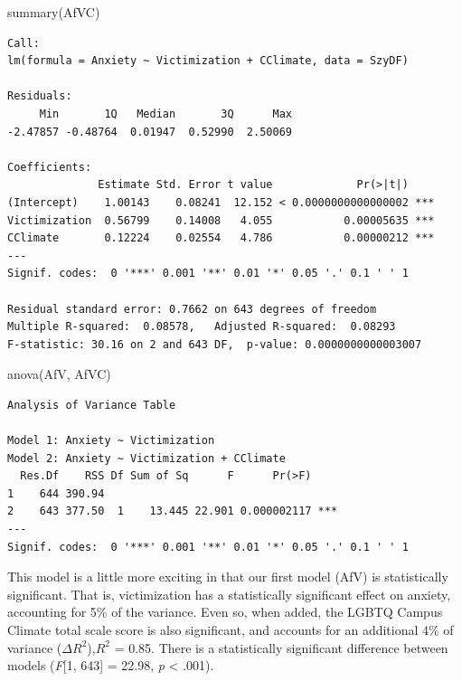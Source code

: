 \documentclass[
  english,
]{book}
\newenvironment{Shaded}{\begin{snugshade}}{\end{snugshade}}
\newcommand{\FunctionTok}[1]{\textcolor[rgb]{0.00,0.00,0.00}{#1}}
\newcommand{\NormalTok}[1]{#1}
\begin{document}
\begin{Shaded}
\begin{Highlighting}[]
\FunctionTok{summary}\NormalTok{(AfVC)}
\end{Highlighting}
\end{Shaded}

\begin{verbatim}
Call:
lm(formula = Anxiety ~ Victimization + CClimate, data = SzyDF)

Residuals:
     Min       1Q   Median       3Q      Max 
-2.47857 -0.48764  0.01947  0.52990  2.50069 

Coefficients:
              Estimate Std. Error t value             Pr(>|t|)    
(Intercept)    1.00143    0.08241  12.152 < 0.0000000000000002 ***
Victimization  0.56799    0.14008   4.055           0.00005635 ***
CClimate       0.12224    0.02554   4.786           0.00000212 ***
---
Signif. codes:  0 '***' 0.001 '**' 0.01 '*' 0.05 '.' 0.1 ' ' 1

Residual standard error: 0.7662 on 643 degrees of freedom
Multiple R-squared:  0.08578,   Adjusted R-squared:  0.08293 
F-statistic: 30.16 on 2 and 643 DF,  p-value: 0.0000000000003007
\end{verbatim}

\begin{Shaded}
\begin{Highlighting}[]
\FunctionTok{anova}\NormalTok{(AfV, AfVC)}
\end{Highlighting}
\end{Shaded}

\begin{verbatim}
Analysis of Variance Table

Model 1: Anxiety ~ Victimization
Model 2: Anxiety ~ Victimization + CClimate
  Res.Df    RSS Df Sum of Sq      F      Pr(>F)    
1    644 390.94                                    
2    643 377.50  1    13.445 22.901 0.000002117 ***
---
Signif. codes:  0 '***' 0.001 '**' 0.01 '*' 0.05 '.' 0.1 ' ' 1
\end{verbatim}

This model is a little more exciting in that our first model (AfV) is statistically significant. That is, victimization has a statistically significant effect on anxiety, accounting for 5\% of the variance. Even so, when added, the LGBTQ Campus Climate total scale score is also significant, and accounts for an additional 4\% of variance (\(\Delta{R^2}\)),\(R^2\) = 0.85. There is a statistically significant difference between models (\emph{F}{[}1, 643{]} = 22.98, \emph{p} \textless{} .001).
\end{document}
